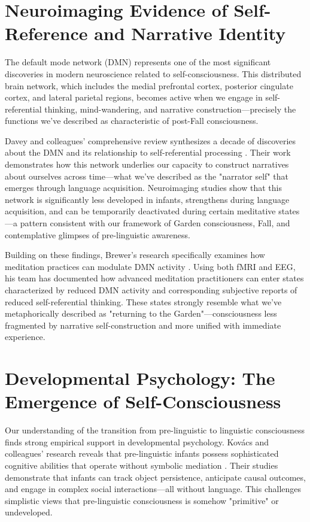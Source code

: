 \section{Neuroimaging Evidence of Self-Reference and Narrative Identity}

The default mode network (DMN) represents one of the most significant discoveries in modern neuroscience related to self-consciousness. This distributed brain network, which includes the medial prefrontal cortex, posterior cingulate cortex, and lateral parietal regions, becomes active when we engage in self-referential thinking, mind-wandering, and narrative construction—precisely the functions we've described as characteristic of post-Fall consciousness.

Davey and colleagues' comprehensive review synthesizes a decade of discoveries about the DMN and its relationship to self-referential processing \parencite{davey2024default}. Their work demonstrates how this network underlies our capacity to construct narratives about ourselves across time—what we've described as the "narrator self" that emerges through language acquisition. Neuroimaging studies show that this network is significantly less developed in infants, strengthens during language acquisition, and can be temporarily deactivated during certain meditative states—a pattern consistent with our framework of Garden consciousness, Fall, and contemplative glimpses of pre-linguistic awareness.

Building on these findings, Brewer's research specifically examines how meditation practices can modulate DMN activity \parencite{brewer2024meditation}. Using both fMRI and EEG, his team has documented how advanced meditation practitioners can enter states characterized by reduced DMN activity and corresponding subjective reports of reduced self-referential thinking. These states strongly resemble what we've metaphorically described as "returning to the Garden"—consciousness less fragmented by narrative self-construction and more unified with immediate experience.

\section{Developmental Psychology: The Emergence of Self-Consciousness}

Our understanding of the transition from pre-linguistic to linguistic consciousness finds strong empirical support in developmental psychology. Kovács and colleagues' research reveals that pre-linguistic infants possess sophisticated cognitive abilities that operate without symbolic mediation \parencite{kovacs2024prelinguistic}. Their studies demonstrate that infants can track object persistence, anticipate causal outcomes, and engage in complex social interactions—all without language. This challenges simplistic views that pre-linguistic consciousness is somehow "primitive" or undeveloped.

